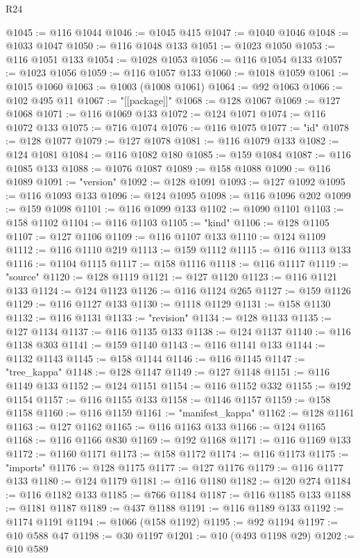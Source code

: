 \begin{lexlean}{R24}
\begin{coremodule}
@1045 := @116 @1044
@1046 := @1045 @415
@1047 := @1040 @1046
@1048 := @1033 @1047
@1050 := @116 @1048 @133
@1051 := @1023 @1050
@1053 := @116 @1051 @133
@1054 := @1028 @1053
@1056 := @116 @1054 @133
@1057 := @1023 @1056
@1059 := @116 @1057 @133
@1060 := @1018 @1059
@1061 := @1015 @1060
@1063 := @1003 (@1008 @1061)
@1064 := @92 @1063
@1066 := @102 @495 @11
@1067 := "[[package]]"
@1068 := @128 @1067
@1069 := @127 @1068
@1071 := @116 @1069 @133
@1072 := @124 @1071
@1074 := @116 @1072 @133
@1075 := @716 @1074
@1076 := @116 @1075
@1077 := "id"
@1078 := @128 @1077
@1079 := @127 @1078
@1081 := @116 @1079 @133
@1082 := @124 @1081
@1084 := @116 @1082 @180
@1085 := @159 @1084
@1087 := @116 @1085 @133
@1088 := @1076 @1087
@1089 := @158 @1088
@1090 := @116 @1089
@1091 := "version"
@1092 := @128 @1091
@1093 := @127 @1092
@1095 := @116 @1093 @133
@1096 := @124 @1095
@1098 := @116 @1096 @202
@1099 := @159 @1098
@1101 := @116 @1099 @133
@1102 := @1090 @1101
@1103 := @158 @1102
@1104 := @116 @1103
@1105 := "kind"
@1106 := @128 @1105
@1107 := @127 @1106
@1109 := @116 @1107 @133
@1110 := @124 @1109
@1112 := @116 @1110 @219
@1113 := @159 @1112
@1115 := @116 @1113 @133
@1116 := @1104 @1115
@1117 := @158 @1116
@1118 := @116 @1117
@1119 := "source"
@1120 := @128 @1119
@1121 := @127 @1120
@1123 := @116 @1121 @133
@1124 := @124 @1123
@1126 := @116 @1124 @265
@1127 := @159 @1126
@1129 := @116 @1127 @133
@1130 := @1118 @1129
@1131 := @158 @1130
@1132 := @116 @1131
@1133 := "revision"
@1134 := @128 @1133
@1135 := @127 @1134
@1137 := @116 @1135 @133
@1138 := @124 @1137
@1140 := @116 @1138 @303
@1141 := @159 @1140
@1143 := @116 @1141 @133
@1144 := @1132 @1143
@1145 := @158 @1144
@1146 := @116 @1145
@1147 := "tree_kappa"
@1148 := @128 @1147
@1149 := @127 @1148
@1151 := @116 @1149 @133
@1152 := @124 @1151
@1154 := @116 @1152 @332
@1155 := @192 @1154
@1157 := @116 @1155 @133
@1158 := @1146 @1157
@1159 := @158 @1158
@1160 := @116 @1159
@1161 := "manifest_kappa"
@1162 := @128 @1161
@1163 := @127 @1162
@1165 := @116 @1163 @133
@1166 := @124 @1165
@1168 := @116 @1166 @830
@1169 := @192 @1168
@1171 := @116 @1169 @133
@1172 := @1160 @1171
@1173 := @158 @1172
@1174 := @116 @1173
@1175 := "imports"
@1176 := @128 @1175
@1177 := @127 @1176
@1179 := @116 @1177 @133
@1180 := @124 @1179
@1181 := @116 @1180
@1182 := @120 @274
@1184 := @116 @1182 @133
@1185 := @766 @1184
@1187 := @116 @1185 @133
@1188 := @1181 @1187
@1189 := @437 @1188
@1191 := @116 @1189 @133
@1192 := @1174 @1191
@1194 := @1066 (@158 @1192)
@1195 := @92 @1194
@1197 := @10 @588 @47
@1198 := @30 @1197
@1201 := @10 (@493 @1198 @29)
@1202 := @10 @589

\end{coremodule}
\end{lexlean}
